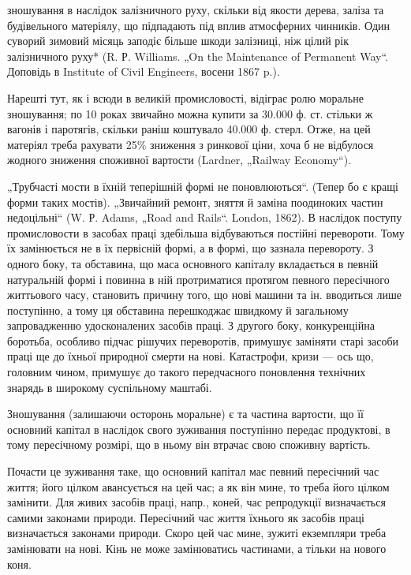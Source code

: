 \parcont{}  %
зношування в наслідок залізничного руху, скільки від якости дерева, заліза та будівельного
матеріялу, що підпадають під вплив атмосферних чинників. Один суворий зимовий місяць заподіє більше
шкоди залізниці, ніж цілий рік залізничного руху* (R. Р. Williams. „On the Maintenance of Permanent
Way“. Доповідь в Institute of Civil Engineers, восени 1867 p.).

Нарешті тут, як і всюди в великій промисловості, відіграє ролю моральне зношування; по 10 роках
звичайно можна купити за 30.000 ф. ст. стільки ж вагонів і паротягів, скільки раніш коштувало 40.000
ф. стерл. Отже, на цей матеріял треба рахувати 25\% зниження з ринкової ціни, хоча б не відбулося
жодного зниження споживної вартости (Lardner,
„Railway Economy“).

„Трубчасті мости в їхній теперішній формі не поновлюються“. (Тепер бо є кращі форми таких мостів).
„Звичайний ремонт, зняття й заміна поодиноких частин недоцільні“ (W. Р. Adams, „Road and Rails“.
London, 1862). В наслідок поступу промисловости в засобах праці здебільша відбуваються постійні
перевороти. Тому їх замінюється не в їх первісній формі, а в формі, що зазнала перевороту. З одного
боку, та обставина,
що маса основного капіталу вкладається в певній натуральній формі і повинна в ній протриматися
протягом певного пересічного життьового часу, становить причину того, що нові машини та ін.
вводиться лише поступінно, а тому ця обставина перешкоджає швидкому й загальному запровадженню
удосконалених засобів праці. З другого боку, конкуренційна боротьба, особливо підчас рішучих
переворотів, примушує заміняти
старі засоби праці ще до їхньої природної смерти на нові. Катастрофи, кризи — ось що, головним
чином, примушує до такого передчасного поновлення технічних знарядь в широкому суспільному маштабі.

Зношування (залишаючи осторонь моральне) є та частина вартости, що її основний капітал в наслідок
свого зуживання поступінно передає продуктові, в тому пересічному розмірі, що в ньому він втрачає
свою споживну вартість.

Почасти це зуживання таке, що основний капітал має певний пересічний час життя; його цілком
авансується на цей час; а як він мине, то треба його цілком замінити. Для живих засобів праці,
напр., коней, час репродукції визначається самими законами природи. Пересічний час життя їхнього як
засобів праці визначається законами природи. Скоро цей час мине, зужиті екземпляри треба замінювати
на нові. Кінь не може замінюватись частинами, а тільки на нового коня.

